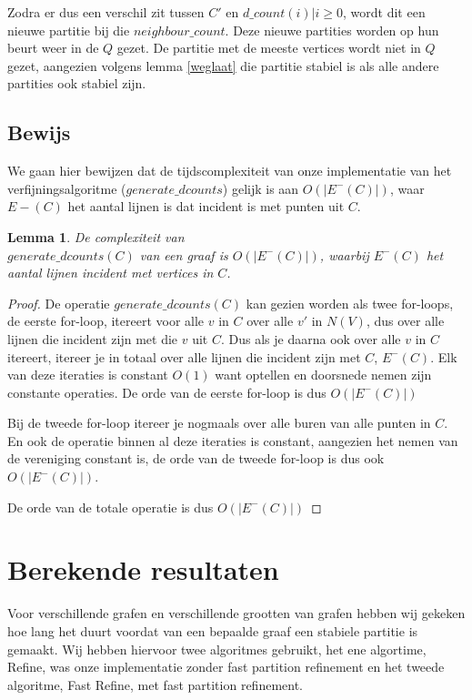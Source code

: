 \documentclass[twoside]{article}
\newtheorem{lemma}[theorem]{Lemma}
\begin{document}
\begin{multicols}{2}
Zodra er dus een verschil zit tussen $C'$ en $d\_count(i) | i\geq 0$, wordt dit een nieuwe partitie bij die $neighbour\_count$. Deze nieuwe partities worden op hun beurt weer in de $Q$ gezet. De partitie met de meeste vertices wordt niet in $Q$ gezet, aangezien volgens lemma \ref{weglaat} die partitie stabiel is als alle andere partities ook stabiel zijn.

\subsection{Bewijs}

We gaan hier bewijzen dat de tijdscomplexiteit van onze implementatie van het verfijningsalgoritme ($generate\_dcounts$) gelijk is aan $ O(|E^{-}(C)|)$,  waar $ E{-}(C) $ het aantal lijnen is dat incident is met punten uit $C$.

\begin{lemma}
De complexiteit van\\ $generate\_dcounts(C)$ van een graaf is $O(|E^{-}(C)|) $,  waarbij  $E^{-}(C)$ het aantal lijnen incident met vertices in $C$.
\end{lemma}

\begin{proof}
De operatie $generate\_dcounts(C) $ kan gezien worden als twee for-loops, de eerste for-loop, itereert voor alle $v$ in $C$ over alle $v'$ in $N(V)$, dus over alle lijnen die incident zijn met die $v$ uit $C$. Dus als je daarna ook over alle $v$ in $C$ itereert, itereer je in totaal over alle lijnen die incident zijn met $C$, $E^{-}(C)$. Elk van deze iteraties is constant $O(1)$ want optellen en doorsnede nemen zijn constante operaties. De orde van de eerste for-loop is dus $O(|E^{-}(C)|)$

Bij de tweede for-loop itereer je nogmaals over alle buren van alle punten in $C$. En ook de operatie binnen al deze iteraties is constant, aangezien het nemen van de vereniging constant is, de orde van de tweede for-loop is dus ook $O(|E^{-}(C)|)$.

De orde van de totale operatie is dus $O(|E^{-}(C)|)$
\end{proof}


\section{Berekende resultaten}

Voor verschillende grafen en verschillende grootten van grafen hebben wij gekeken hoe lang het duurt voordat van een bepaalde graaf een stabiele partitie is gemaakt. Wij hebben hiervoor twee algoritmes gebruikt, het ene algortime, Refine, was onze implementatie zonder fast partition refinement en het tweede algoritme, Fast Refine, met fast partition refinement.


\end{multicols}
\end{document}
